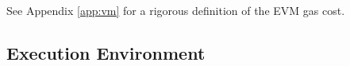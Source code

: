 \documentclass[9pt,oneside]{amsart}
\begin{document}
\begin{multicols}{2}
%
%

See Appendix \ref{app:vm} for a rigorous definition of the EVM gas cost.


\subsection{Execution Environment}


\end{multicols}
\end{document}
